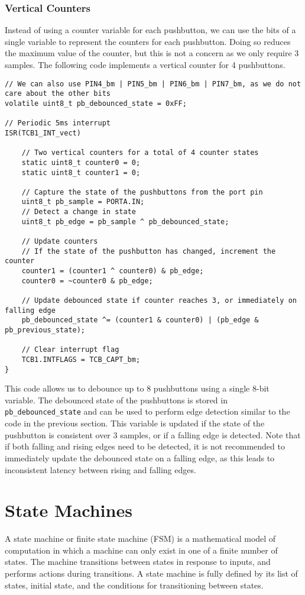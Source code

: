 \documentclass{article}
\begin{document}
\subsubsection{Vertical Counters}
Instead of using a counter variable for each pushbutton, we can use the
bits of a single variable to represent the counters for each
pushbutton. Doing so reduces the maximum value of the counter, but this
is not a concern as we only require 3 samples. The following code
implements a vertical counter for 4 pushbuttons.
\begin{verbatim}
// We can also use PIN4_bm | PIN5_bm | PIN6_bm | PIN7_bm, as we do not care about the other bits
volatile uint8_t pb_debounced_state = 0xFF;

// Periodic 5ms interrupt
ISR(TCB1_INT_vect)

    // Two vertical counters for a total of 4 counter states
    static uint8_t counter0 = 0;
    static uint8_t counter1 = 0;

    // Capture the state of the pushbuttons from the port pin
    uint8_t pb_sample = PORTA.IN;
    // Detect a change in state
    uint8_t pb_edge = pb_sample ^ pb_debounced_state;

    // Update counters
    // If the state of the pushbutton has changed, increment the counter
    counter1 = (counter1 ^ counter0) & pb_edge;
    counter0 = ~counter0 & pb_edge;

    // Update debounced state if counter reaches 3, or immediately on falling edge
    pb_debounced_state ^= (counter1 & counter0) | (pb_edge & pb_previous_state);

    // Clear interrupt flag
    TCB1.INTFLAGS = TCB_CAPT_bm;
}
\end{verbatim}
This code allows us to debounce up to 8 pushbuttons using a single
8-bit variable. The debounced state of the pushbuttons is stored in
\texttt{pb_debounced_state} and can be used to perform edge
detection similar to the code in the previous section. This variable
is updated if the state of the pushbutton is consistent over 3 samples,
or if a falling edge is detected. Note that if both falling and rising
edges need to be detected, it is not recommended to immediately update
the debounced state on a falling edge, as this leads to inconsistent
latency between rising and falling edges.
\section{State Machines}
A state machine or finite state machine (FSM) is a mathematical model
of computation in which a machine can only exist in one of a finite
number of states. The machine transitions between states in response to
inputs, and performs actions during transitions. A state machine is
fully defined by its list of states, initial state, and the conditions
for transitioning between states.
\end{document}
